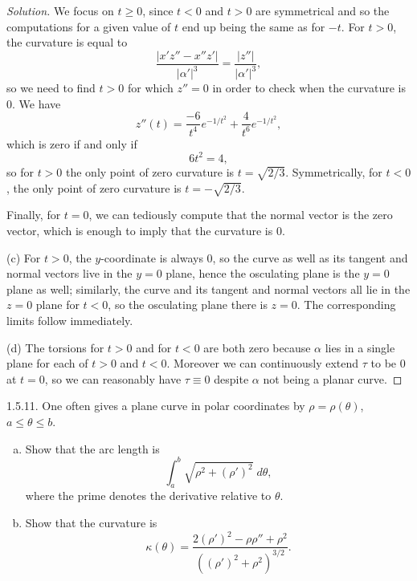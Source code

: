 \documentclass[11pt]{scrartcl}
\providecommand{\ii}{\item}
\providecommand{\dif}{\;d}
\newenvironment{soln}{\begin{proof}[Solution]}{\end{proof}}
\begin{document}
\begin{soln}
	We focus on $t\ge 0$, since $t < 0$ and $t > 0$
	are symmetrical and so the computations for a given value of $t$
	end up being the same as for $-t$.
	For $t > 0$, the curvature is equal to
	\[\frac{|x'z'' - x''z'|}{|\alpha'|^3}
	= \frac{|z''|}{|\alpha'|^3},\]
	so we need to find $t > 0$ for which $z'' = 0$ in order to check
	when the curvature is $0$. We have
	\[z''(t) = \frac{-6}{t^4}e^{-1/t^2} + \frac{4}{t^6} e^{-1/t^2},\]
	which is zero if and only if
	\[6t^2 = 4,\]
	so for $t > 0$ the only point of zero curvature is $t = \sqrt{2/3}$.
	Symmetrically, for $t<0$, the only point of zero curvature
	is $t = -\sqrt{2/3}$.
	
	Finally, for $t = 0$, we can tediously compute that
	the normal vector is the zero vector, which is enough to imply
	that the curvature is $0$.
	
	(c) For $t > 0$, the $y$-coordinate is always $0$,
	so the curve as well as its tangent and normal vectors
	live in the $y=0$ plane,
	hence the osculating plane is the $y=0$ plane as well;
	similarly, the curve and its tangent and normal vectors
	all lie in the $z=0$ plane for $t<0$, so
	the osculating plane there is $z=0$.
	The corresponding limits follow immediately.
	
	(d) The torsions for $t > 0$ and for $t < 0$ are both zero
	because $\alpha$ lies in a single plane for each of $t > 0$ and $t < 0$.
	Moreover we can continuously extend $\tau$ to be $0$ at $t=0$,
	so we can reasonably have $\tau\equiv 0$ despite $\alpha$
	not being a planar curve.
\end{soln}

\begin{problem*}1.5.11.
	One often gives a plane curve in polar coordinates by $\rho = \rho(\theta)$,
	$a\le\theta\le b$.
	\begin{enumerate}[(a)]
		\ii Show that the arc length is
		\[\int_a^b \sqrt{\rho^2 + (\rho')^2}\dif\theta,\]
		where the prime denotes the derivative relative to $\theta$.
		\ii Show that the curvature is
		\[\kappa(\theta) = \frac{2(\rho')^2 - \rho\rho'' + \rho^2}
		{((\rho')^2+\rho^2)^{3/2}}.\]
	\end{enumerate}
\end{problem*}
\end{document}
